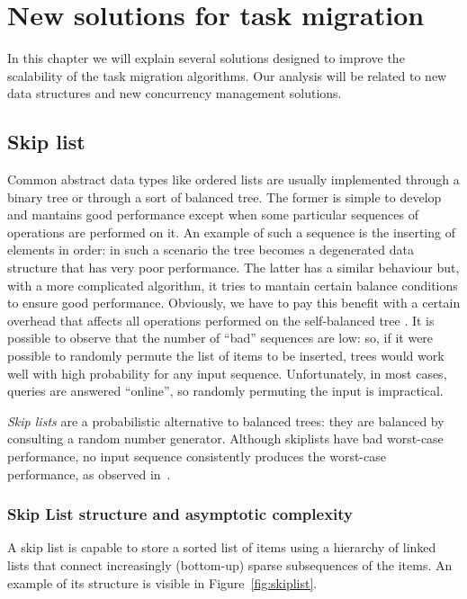 \chapter{New solutions for task migration\label{chap:data_struct_dev}}

In this chapter we will explain several solutions designed to improve the
scalability of the task migration algorithms. Our analysis will be related 
to new data structures and new concurrency management solutions.

\section{Skip list\label{Skiplist}}

Common abstract data types like ordered lists are usually implemented through
a binary tree or through a sort of balanced tree. The former is simple
to develop and mantains good performance except when some particular sequences of
operations are performed on it. An example of such a sequence is the inserting 
of elements in order: in such a scenario the tree becomes a degenerated data structure
that has very poor performance. The latter has a similar behaviour but, with
a more complicated algorithm, it tries to mantain certain balance conditions
to ensure good performance. Obviously, we have to pay this benefit
with a certain overhead that affects all operations performed on the self-balanced
tree
.
It is possible to observe that the number of ``bad'' sequences are low: so, if it
were possible to randomly permute the list of items to be inserted, trees would work
well with high probability for any input sequence. Unfortunately, in most cases,
queries are answered ``online'', so randomly permuting the input is impractical.

\emph{Skip lists} are a probabilistic alternative to balanced trees: they are
balanced by consulting a random number generator. Although skiplists have bad
worst-case performance, no input sequence consistently produces the worst-case
performance, as observed in~\cite{Pugh}.

\subsection{Skip List structure and asymptotic complexity}
A skip list is capable to store a sorted list of items using a hierarchy of linked
lists that connect increasingly (bottom-up) sparse subsequences of the items. An
example of its structure is visible in Figure~\vref{fig:skiplist}.

